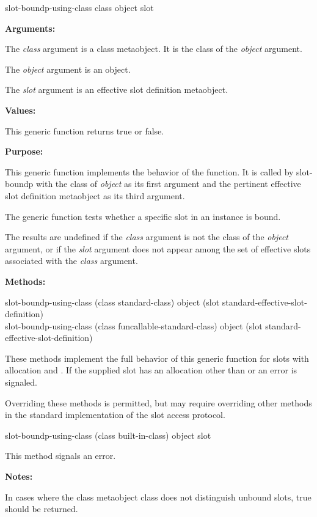 \begin{defun}
slot-boundp-using-class class object slot

\textbf{Arguments:}

The \emph{class} argument is a class metaobject. It is the class of the
\emph{object} argument.

The \emph{object} argument is an object.

The \emph{slot} argument is an effective slot definition metaobject.

\textbf{Values:}

This generic function returns true or false.

\textbf{Purpose:}

This generic function implements the behavior of the 
function. It is called by slot-boundp with the class of \emph{object} as its
first argument and the pertinent effective slot definition metaobject as its
third argument.

The generic function  tests whether a specific slot
in an instance is bound.

The results are undefined if the \emph{class} argument is not the class of the
\emph{object} argument, or if the \emph{slot} argument does not appear among the
set of effective slots associated with the \emph{class} argument.

\textbf{Methods:}

\begin{defun}
slot-boundp-using-class (class standard-class) object (slot standard-effective-slot-definition) \\
slot-boundp-using-class (class funcallable-standard-class) object (slot standard-effective-slot-definition)

These methods implement the full behavior of this generic function for slots
with allocation  and . If the supplied slot has an
allocation other than  or  an error is signaled.

Overriding these methods is permitted, but may require overriding other methods
in the standard implementation of the slot access protocol.
\end{defun}

\begin{defun}
slot-boundp-using-class (class built-in-class) object slot

This method signals an error.
\end{defun}

\textbf{Notes:}

In cases where the class metaobject class does not distinguish unbound slots,
true should be returned.
\end{defun}

